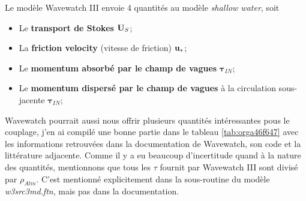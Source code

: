 \documentclass[10pt]{report}
\numberwithin{equation}{section}
\newcommand{\uu}{\vb{u}}
\begin{document}
Le modèle Wavewatch III envoie 4 quantités au modèle \emph{shallow water}, soit
\begin{itemize}
\item Le \textbf{transport de Stokes} \(\vb{U}_S\);
\item La \textbf{friction velocity} (vitesse de friction) \(\vb{\uu}_*\);
\item Le \textbf{momentum absorbé par le champ de vagues} \(\boldsymbol{\tau}_{IN}\);
\item Le \textbf{momentum dispersé par le champ de vagues} à la circulation sous-jacente \(\boldsymbol{\tau}_{IN}\);\bigskip
\end{itemize}

Wavewatch pourrait aussi nous offrir plusieurs quantités intéressantes pous le couplage, j'en ai compilé une bonne partie dans le tableau \ref{tab:orga46f647} avec les informations retrouvées dans la documentation de Wavewatch, son code et la littérature adjacente.
Comme il y a eu beaucoup d'incertitude quand à la nature des quantités, mentionnons que tous les \(\tau\) fournit par Wavewatch III sont divisé par \(\rho_{Atm}\).
C'est mentionné explicitement dans la sous-routine du modèle \emph{w3src3md.ftn}, mais pas dans la documentation.
\end{document}
